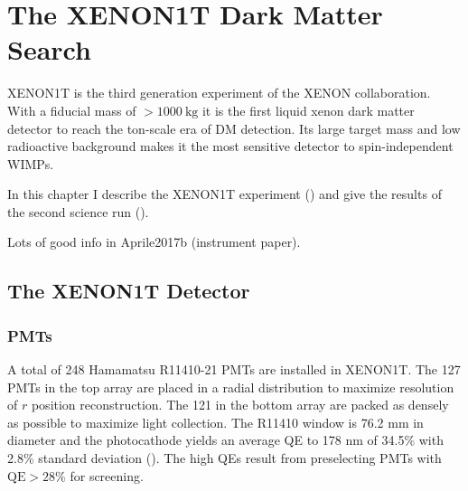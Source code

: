 

\pagestyle{cu}
\graphicspath{{./Chapter3/Figures/}}
\chapter[The XENON1T Dark Matter Search][The XENON1T Dark Matter Search]{The XENON1T Dark Matter Search}



XENON1T is the third generation experiment of the XENON collaboration.  With a fiducial mass of $> 1000\ \mathrm{kg}$ it is the first
liquid xenon dark matter detector to reach the ton-scale era of DM detection.  Its large target mass and low radioactive background
makes it the most sensitive detector to spin-independent WIMPs.

In this chapter I describe the XENON1T experiment () and give the results of the second science run
().

Lots of good info in Aprile2017b (instrument paper).

\section{The XENON1T Detector}
\label{sec:xenon1t_detector}




\subsection{PMTs}
\label{subsec:xenon1t_pmts}
A total of 248 Hamamatsu R11410-21 PMTs are installed in XENON1T.  The 127 PMTs in the top array are placed in a radial distribution to
maximize resolution of $r$ position reconstruction.  The 121 in the bottom array are packed as densely as possible to maximize light
collection.  The R11410 window is 76.2 mm in diameter and the photocathode yields an average QE to 178 nm of 34.5\% with 2.8\%
standard deviation ().  The high QEs result from preselecting PMTs with $\mathrm{QE} > 28\%$ for
screening.

